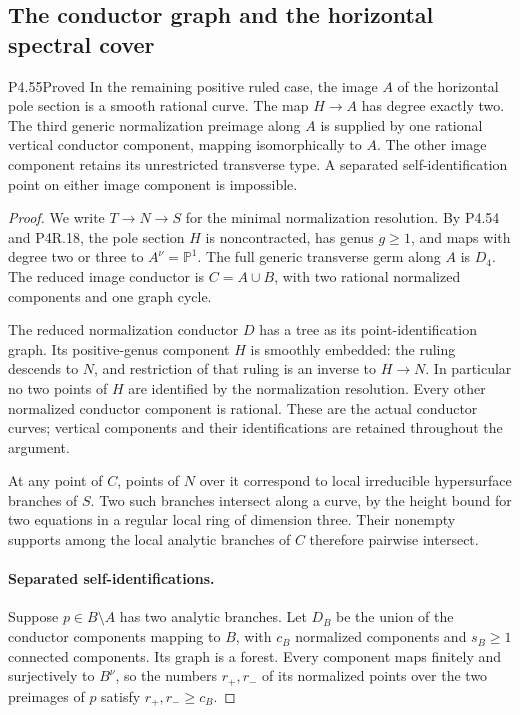 \subsection{The conductor graph and the horizontal spectral cover}

\begin{statement}{P4.55}{Proved}
In the remaining positive ruled case, the image $A$ of the
horizontal pole section is a smooth rational curve. The map
$H\to A$ has degree exactly two. The third generic
normalization preimage along $A$ is supplied by one rational
vertical conductor component, mapping isomorphically to $A$.
The other image component retains its unrestricted transverse
type. A separated self-identification point on either image
component is impossible.
\end{statement}
\begin{proof}
We write $T\to N\to S$ for the minimal normalization
resolution. By P4.54 and P4R.18, the pole section $H$ is
noncontracted, has genus $g\ge1$, and maps with degree two
or three to $A^\nu=\mathbb P^1$. The full generic transverse
germ along $A$ is $D_4$. The reduced image conductor is
$C=A\cup B$, with two rational normalized components and
one graph cycle.

The reduced normalization conductor $D$ has a tree as its
point-identification graph. Its positive-genus component
$H$ is smoothly embedded: the ruling descends to $N$, and
restriction of that ruling is an inverse to $H\to N$.
In particular no two points of $H$ are identified by the
normalization resolution. Every other normalized conductor
component is rational. These are the actual conductor
curves; vertical components and their identifications are
retained throughout the argument.

At any point of $C$, points of $N$ over it correspond to
local irreducible hypersurface branches of $S$. Two such
branches intersect along a curve, by the height bound for
two equations in a regular local ring of dimension three.
Their nonempty supports among the local analytic branches
of $C$ therefore pairwise intersect.

\paragraph{Separated self-identifications.}
Suppose $p\in B\setminus A$ has two analytic branches.
Let $D_B$ be the union of the conductor components mapping
to $B$, with $c_B$ normalized components and $s_B\ge1$
connected components. Its graph is a forest. Every component
maps finitely and surjectively to $B^\nu$, so the numbers
$r_+,r_-$ of its normalized points over the two preimages
of $p$ satisfy $r_+,r_-\ge c_B$.


\end{proof}

